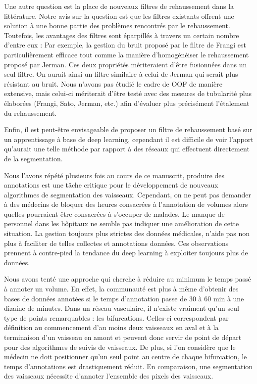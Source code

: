 Une autre question est la place de nouveaux filtres de rehaussement dans la littérature. Notre avis sur la question est que les filtres existants offrent une solution à une bonne partie des problèmes rencontrés par le rehaussement. Toutefois, les avantages des filtres sont éparpillés à travers un certain nombre d'entre eux : Par exemple, la gestion du bruit proposé par le filtre de Frangi est particulièrement efficace tout comme la manière d'homogénéiser le rehaussement proposé par Jerman. Ces deux propriétés mériteraient d'être fusionnées dans un seul filtre. On aurait ainsi un filtre similaire à celui de Jerman qui serait plus résistant au bruit. Nous n'avons pas étudié le cadre de OOF de manière extensive, mais celui-ci mériterait d'être testé avec des mesures de tubularité plus élaborées (Frangi, Sato, Jerman, etc.) afin d'évaluer plus précisément l'étalement du rehaussement.

Enfin, il est peut-être envisageable de proposer un filtre de rehaussement basé sur un apprentissage à base de deep learning, cependant il est difficile de voir l'apport qu'aurait une telle méthode par rapport à des réseaux qui effectuent directement de la segmentation.

Nous l'avons répété plusieurs fois au cours de ce manuscrit, produire des annotations est une tâche critique pour le développement de nouveaux algorithmes de segmentation des vaisseaux. Cependant, on ne peut pas demander à des médecins de bloquer des heures consacrées à l'annotation de volumes alors quelles pourraient être consacrées à s'occuper de malades. Le manque de personnel dans les hôpitaux ne semble pas indiquer une amélioration de cette situation. La gestion toujours plus strictes des données médicales, n'aide pas non plus à faciliter de telles collectes et annotations données. Ces observations prennent à contre-pied la tendance du deep learning à exploiter toujours plus de données.

Nous avons tenté une approche qui cherche à réduire au minimum le temps passé à annoter un volume. En effet, la communauté est plus à même d'obtenir des bases de données annotées si le temps d'annotation passe de 30 à 60 min à une dizaine de minutes. Dans un réseau vasculaire, il n'existe vraiment qu'un seul type de points remarquables : les bifurcations. Celles-ci correspondent par définition au commencement d'au moins deux vaisseaux en aval et à la terminaison d'un vaisseau en amont et peuvent donc servir de point de départ pour des algorithmes de suivis de vaisseaux. De plus, si l'on considère que le médecin ne doit positionner qu'un seul point au centre de chaque bifurcation, le temps d'annotations est drastiquement réduit. En comparaison, une segmentation des vaisseaux nécessite d'annoter l'ensemble des pixels des vaisseaux.
 
